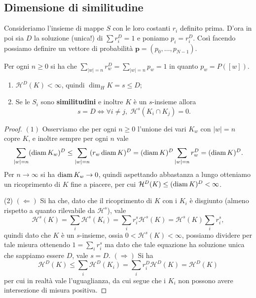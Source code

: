 \subsection{Dimensione di similitudine}

Consideriamo l'insieme di mappe $S$ con le loro costanti $r_{i}$ definito prima.
D'ora in poi sia $D$ la soluzione (unica!) di $\sum r_{i}^{D} = 1$ e poniamo $p_{i} = r_{i}^{D}$. Così facendo possiamo definire un vettore di probabilità $\mathbf p = (p_{0},\dots,p_{N-1})$.
\begin{osservazione}
	Per ogni $n\geq0$ si ha che $\sum_{|w| = n}r_{w}^{D} = \sum_{|w| = n}p_{w} = 1$ in quanto $p_{w} = P([w])$.
\end{osservazione}

\begin{proposizione}
	\begin{enumerate}
		\item $\mathcal H^{D}(K) < \infty$, quindi $\dim_{H}K = s\leq D$;
		\item Se le $S_{i}$ sono \textbf{similitudini} e inoltre $K$ è un $s$-insieme allora 
		$$s = D\iff \forall i\neq j,\; \mathcal H^{s}(K_{i}\cap K_{j})=0.$$
	\end{enumerate}
\end{proposizione}
\begin{proof}
	$(1)$ Osserviamo che per ogni $n\geq0$ l'unione dei vari $K_{w}$ con $|w| = n$ copre $K$, e inoltre sempre per ogni $n$ vale
	\begin{align*}
		\sum_{|w| = n}(\operatorname{diam} K_{w})^{D} \leq
		\sum_{|w| = n}(r_{w}\operatorname{diam} K)^{D} = 
		(\operatorname{diam} K)^{D}\sum_{|w| = n}r_{w}^{D} = (\operatorname{diam} K)^{D}.
	\end{align*}
	Per $n\to\infty$ si ha $\operatorname{diam} K_{w}\to0$, quindi aspettando abbastanza a lungo otteniamo un ricoprimento di $K$ fine a piacere, per cui $\mathcal H^{D}(K)\leq (\operatorname{diam} K)^{D} <\infty$.
	
	(2) $(\Leftarrow)$ Si ha che, dato che il ricoprimento di $K$ con i $K_{i}$ è disgiunto (almeno rispetto a quanto rilevabile da $\mathcal H^{s}$), vale
	$$\mathcal H^{s}(K) = \sum_{i}\mathcal H^{s}(K_{i}) = \sum_{i}r_{i}^{s}\mathcal H^{s}(K) = \mathcal H^{s}(K)\sum_{i}r_{i}^{s},$$
	quindi dato che $K$ è un $s$-insieme, ossia $0<\mathcal H^{s}(K) <\infty$, possiamo dividere per tale misura ottenendo $1 = \sum_{i}r_{i}^{s}$ ma dato che tale equazione ha soluzione unica che sappiamo essere $D$, vale $s = D$.
	$(\Rightarrow)$ Si ha 
	$$\mathcal H^{D}(K) \leq \sum_{i}\mathcal H^{D}(K_{i}) = \sum_{i}r_{i}^{D}\mathcal H^{D}(K) = \mathcal H^{D}(K)$$
	per cui in realtà vale l'uguaglianza, da cui segue che i $K_{i}$ non possono avere intersezione di misura positiva.
\end{proof}

